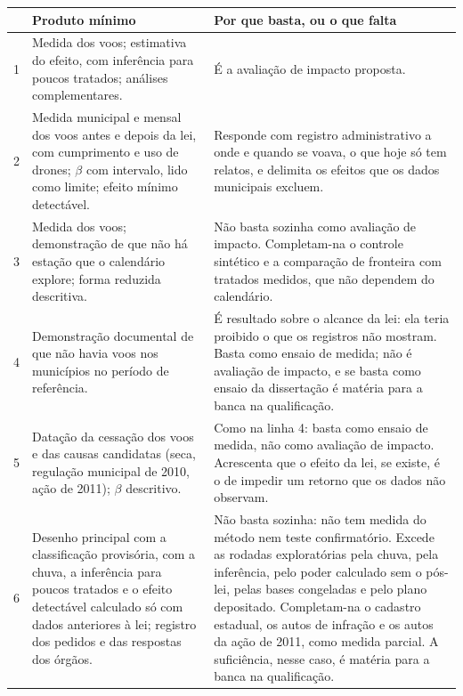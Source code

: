 \begin{apendicesenv}
\begin{quadro}[htb]
\caption{\label{qua:suficiencia}Produto mínimo de cada linha do Quadro~\ref{qua:regra}}
\centering
\footnotesize
\begin{tabular}{@{}p{0.5cm}p{6.6cm}p{7.4cm}@{}}
\toprule
 & Produto mínimo & Por que basta, ou o que falta \\
\midrule
1 & Medida dos voos; estimativa do efeito, com inferência para poucos tratados; análises complementares. &
É a avaliação de impacto proposta. \\
2 & Medida municipal e mensal dos voos antes e depois da lei, com cumprimento e uso de drones; $\beta$ com intervalo, lido como limite; efeito mínimo detectável. &
Responde com registro administrativo a onde e quando se voava, o que hoje só tem relatos, e delimita os efeitos que os dados municipais excluem. \\
3 & Medida dos voos; demonstração de que não há estação que o calendário explore; forma reduzida descritiva. &
Não basta sozinha como avaliação de impacto. Completam-na o controle sintético e a comparação de fronteira com tratados medidos, que não dependem do calendário. \\
4 & Demonstração documental de que não havia voos nos municípios no período de referência. &
É resultado sobre o alcance da lei: ela teria proibido o que os registros não mostram. Basta como ensaio de medida; não é avaliação de impacto, e se basta como ensaio da dissertação é matéria para a banca na qualificação. \\
5 & Datação da cessação dos voos e das causas candidatas (seca, regulação municipal de 2010, ação de 2011); $\beta$ descritivo. &
Como na linha 4: basta como ensaio de medida, não como avaliação de impacto. Acrescenta que o efeito da lei, se existe, é o de impedir um retorno que os dados não observam. \\
6 & Desenho principal com a classificação provisória, com a chuva, a inferência para poucos tratados e o efeito detectável calculado só com dados anteriores à lei; registro dos pedidos e das respostas dos órgãos. &
Não basta sozinha: não tem medida do método nem teste confirmatório. Excede as rodadas exploratórias pela chuva, pela inferência, pelo poder calculado sem o pós-lei, pelas bases congeladas e pelo plano depositado. Completam-na o cadastro estadual, os autos de infração e os autos da ação de 2011, como medida parcial. A suficiência, nesse caso, é matéria para a banca na qualificação. \\
\bottomrule
\end{tabular}
\end{quadro}


\end{apendicesenv}
